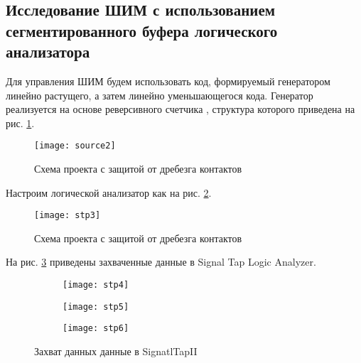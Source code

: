 \subsection{Исследование ШИМ с использованием сегментированного буфера логического анализатора}

Для управления ШИМ будем использовать код, формируемый генератором линейно растущего, а затем линейно уменьшающегося кода. Генератор реализуется на основе реверсивного счетчика , структура которого приведена на рис. \ref{fig:source2}.
\begin{figure}[H]
	\begin{center}
		\texttt{[image: source2]}
		\caption{Схема проекта с защитой от дребезга контактов}
		\label{fig:source2}
	\end{center}
\end{figure}

Настроим логической анализатор как на рис. \ref{fig:stp3}.
\begin{figure}[H]
	\begin{center}
		\texttt{[image: stp3]}
		\caption{Схема проекта с защитой от дребезга контактов}
		\label{fig:stp3}
	\end{center}
\end{figure}

На рис. \ref{fig:stp4} приведены захваченные данные в Signal Tap Logic Analyzer.
\begin{figure}[H]
	\centering
	\begin{subfigure}[b]{\textwidth}
		\centering
		\texttt{[image: stp4]}
		\vspace{0.2cm}
	\end{subfigure}
	\begin{subfigure}[b]{\textwidth}
		\centering
		\texttt{[image: stp5]}
		\vspace{0.2cm}
	\end{subfigure}
	\begin{subfigure}[b]{\textwidth}
		\centering
		\texttt{[image: stp6]}
	\end{subfigure}
	\caption{Захват данных данные в SignatlTapII}
	\label{fig:stp4}
\end{figure}


